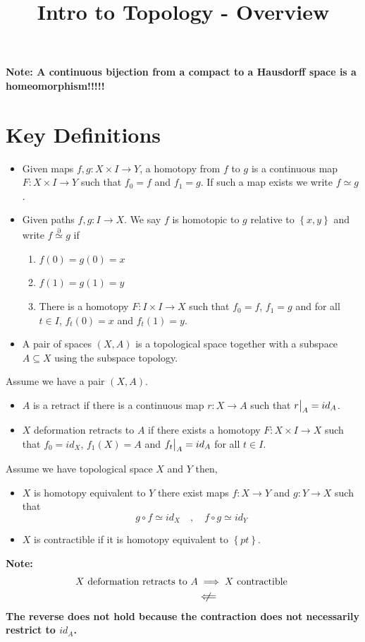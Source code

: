 \documentclass[11pt]{article}
\title{Intro to Topology - Overview}
\author{}
\date{}
\newcommand{\homrel}{\stackrel{\partial}{\simeq}}
\newcommand\restr[2]{{%
  \left.\kern-\nulldelimiterspace %
  #1 %
  \vphantom{\big|} %
  \right|_{#2} %
  }}
\newenvironment{defin}
	{\begin{mdframed}[backgroundcolor=white, roundcorner=5pt, linewidth=1pt]
		\setlength{\parindent}{0pt}
		}
	{\end{mdframed}}
\newcommand{\mdf}[1]{{\color{red} #1}}
\newenvironment{note}
	{\begin{mdframed}[backgroundcolor=white, linecolor=red, roundcorner=5pt, linewidth=1pt]\bfseries{Note:}\normalfont}
	{\end{mdframed}}
\begin{document}
\maketitle

\begin{note}
A continuous bijection from a compact to a Hausdorff space is a homeomorphism!!!!!
\end{note}

\section{Key Definitions}
\begin{defin}
\begin{itemize}
	 \item Given maps $f,g:X\times I \to Y$, a \mdf{homotopy} from $f$ to $g$ is a continuous map  $F:X\times I \to Y$ such that $f_0=f$ and $f_1=g$.
		 If such a map exists we write $f\simeq g$.
	 \item Given paths $f,g:I \to X$. We say \mdf{$f$ is homotopic to $g$ relative to $\left\{x, y\right\}$} and write $f\homrel g$ if
		 \begin{enumerate}[label=(\roman*)]
			 \item $f(0)=g(0)=x$
			 \item $f(1)=g(1)=y$
			 \item There is a homotopy $F:I\times I \to X$ such that $f_0=f$, $f_1=g$ and for all $t\in I$, $f_t(0)=x$ and $f_t(1)=y$.
		 \end{enumerate}
	 \item A \mdf{pair} of spaces $(X,A)$ is a topological space together with a subspace $A\subseteq X$ using the subspace topology.
\end{itemize}
Assume we have a pair $(X,A)$.
\begin{itemize}
	 \item $A$ is a \mdf{retract} if there is a continuous map $r:X\to A$ such that $\restr{r}{A}=id_A$.
	 \item $X$ \mdf{deformation retracts} to $A$ if there exists a homotopy $F:X\times I \to X$ such that $f_0=id_X$, $f_1(X)=A$ and $\restr{f_t}{A}=id_A$ for all $t\in I$.
\end{itemize}
Assume we have topological space $X$ and $Y$ then,
\begin{itemize}
	\item $X$ is \mdf{homotopy equivalent} to $Y$ there exist maps $f:X\to Y$ and $g:Y\to X$ such that
	\[
g\circ f \simeq id_X \quad , \quad f\circ g \simeq id_Y
	\]
\item $X$ is \mdf{contractible} if it is homotopy equivalent to $\left\{pt\right\}$.
	
\end{itemize}
\end{defin}
\begin{note}
	\begin{align*}
		X \text{ deformation retracts to } A &\implies X \text{ contractible }\\
											 &\centernot\Longleftarrow
	\end{align*}
	The reverse does not hold because the contraction does not necessarily restrict to $id_A$.
\end{note}
\end{document}
